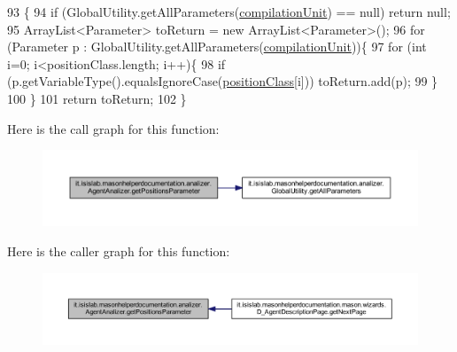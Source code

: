\begin{DoxyCode}
93                                                        \{
94         \textcolor{keywordflow}{if} (GlobalUtility.getAllParameters(\hyperlink{classit_1_1isislab_1_1masonhelperdocumentation_1_1analizer_1_1_agent_analizer_a1fdd2196fdd7b7907ab94da91b8306f4}{compilationUnit}) == null) \textcolor{keywordflow}{return} null;
95         ArrayList<Parameter> toReturn = \textcolor{keyword}{new} ArrayList<Parameter>();
96         \textcolor{keywordflow}{for} (Parameter p : GlobalUtility.getAllParameters(\hyperlink{classit_1_1isislab_1_1masonhelperdocumentation_1_1analizer_1_1_agent_analizer_a1fdd2196fdd7b7907ab94da91b8306f4}{compilationUnit}))\{
97                 \textcolor{keywordflow}{for} (\textcolor{keywordtype}{int} i=0; i<positionClass.length; i++)\{
98                     \textcolor{keywordflow}{if} (p.getVariableType().equalsIgnoreCase(\hyperlink{classit_1_1isislab_1_1masonhelperdocumentation_1_1analizer_1_1_agent_analizer_a9d8e56c5d7ee2102e06e509b301205bb}{positionClass}[i]))    
      toReturn.add(p);
99                 \}               
100         \}
101         \textcolor{keywordflow}{return} toReturn;
102     \}   
\end{DoxyCode}


Here is the call graph for this function\-:
\nopagebreak
\begin{figure}[H]
\begin{center}
\leavevmode
\includegraphics[width=350pt]{classit_1_1isislab_1_1masonhelperdocumentation_1_1analizer_1_1_agent_analizer_aa2e85956f4a23176c398294cf02d859d_cgraph}
\end{center}
\end{figure}




Here is the caller graph for this function\-:
\nopagebreak
\begin{figure}[H]
\begin{center}
\leavevmode
\includegraphics[width=350pt]{classit_1_1isislab_1_1masonhelperdocumentation_1_1analizer_1_1_agent_analizer_aa2e85956f4a23176c398294cf02d859d_icgraph}
\end{center}
\end{figure}


